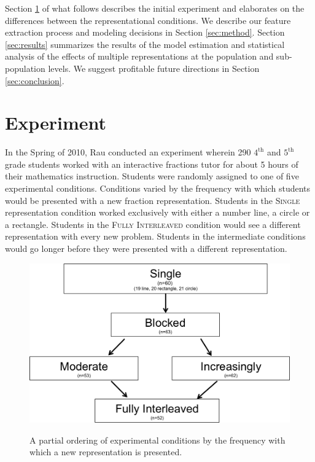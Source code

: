 \documentclass{edm_template}
\newcommand{\mgr}[1]{\textsc{#1}}
\begin{document}
Section \ref{sec:experiment} of what follows describes the initial experiment and elaborates on the differences between the representational conditions. We describe our feature extraction process and modeling decisions in Section \ref{sec:method}. Section \ref{sec:results} summarizes the results of the model estimation and statistical analysis of the effects of multiple representations at the population and sub-population levels. We  suggest profitable future directions in Section \ref{sec:conclusion}.

\section{Experiment}
\label{sec:experiment}

In the Spring of 2010, Rau conducted an experiment wherein 290 $4^\text{th}$ and $5^\text{th}$ grade students worked with an interactive fractions tutor for about 5 hours of their mathematics instruction. Students were randomly assigned to one of five experimental conditions. Conditions varied by the frequency with which students would be presented with a new fraction representation. Students in the \mgr{Single} representation condition worked exclusively with either a number line, a circle or a rectangle. Students in the \mgr{Fully Interleaved} condition would see a different representation with every new problem. Students in the intermediate conditions would go longer before they were presented with a different representation.   
\begin{figure}[htbp]
\centering
\includegraphics[scale=.4]{conditionGraph.png}\\
\caption{A partial ordering of experimental conditions by the frequency with which a new representation is presented. }
\label{fig:condition-graph}
\end{figure}
\end{document}
